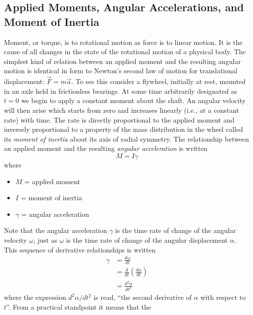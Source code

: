\subsection{Applied Moments, Angular Accelerations, and Moment of Inertia}\label{ch2:sec:1.3}

Moment, or torque, is to rotational motion as force is to linear motion. It is
the cause of all changes in the state of the rotational motion of a physical
body. The simplest kind of relation between an applied moment and the resulting
angular motion is identical in form to Newton's second law of motion for
translational displacement: $\vec{F} = m\vec{a}$. To see this consider a
flywheel, initially at rest, mounted in an axle held in frictionless bearings.
At some time arbitrarily designated as $t = 0$ we begin to apply a constant
moment about the shaft. An angular velocity will then arise which starts from
zero and increases linearly (i.e., at a constant rate) with time. The rate is
directly proportional to the applied moment and inversely proportional to a
property of the mass distribution in the wheel called its \emph{moment of
inertia} about its axis of radial symmetry. The relationship between an applied
moment and the resulting \emph{angular acceleration} is written
\begin{equation}\label{ch2:eq:2}
M = I\gamma
\end{equation}
where
\begin{itemize}[nosep,leftmargin=*,label={}]
  \item $M$ = applied moment
  \item $I$ = moment of inertia
  \item $\gamma$ = angular acceleration
\end{itemize}
Note that the angular acceleration $\gamma$ is the time rate of change of the
angular velocity $\omega$, just as $\omega$ is the time rate of change of the
angular displacement $\alpha$. This sequence of derivative relationships is
written
\begin{equation}\label{ch2:eq:3}
\begin{split}
\gamma &= \frac{d\omega}{dt}\\
&= \frac{d}{dt}\left(\frac{d\alpha}{dt}\right)\\
&= \frac{d^{2}\alpha}{dt^{2}}
\end{split}
\end{equation}
where the expression $d^{2}\alpha/dt^{2}$ is read, ``the second derivative of
$\alpha$ with respect to $t$''. From a practical standpoint it means that the
